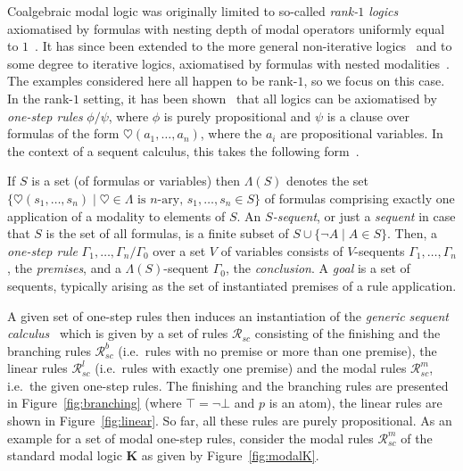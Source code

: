 \documentclass{entcs} \usepackage{entcsmacro}
\newcommand{\hearts}{\heartsuit}
\begin{document}
Coalgebraic modal logic was originally limited to so-called
\emph{rank-$1$ logics} axiomatised by formulas with nesting depth of
modal operators uniformly equal to $1$~\cite{Schroder05}. It has since
been extended to the more general non-iterative
logics~\cite{SchroderPattinson08d} and to some degree to iterative
logics, axiomatised by formulas with nested
modalities~\cite{SchroderPattinson08PHQ}. The examples considered here
all happen to be rank-$1$, so we focus on this case. In the rank-$1$
setting, it has been shown~\cite{Schroder05} that all logics can be
axiomatised by \emph{one-step rules} $\phi/\psi$, where $\phi$ is
purely propositional and $\psi$ is a clause over formulas of the form
$\hearts(a_1,\dots,a_n)$, where the $a_i$ are propositional
variables. In the context of a sequent calculus, this takes the
following form~\cite{PattinsonSchroder08b}.
\begin{definition}
  If $S$ is a set (of formulas or variables) then $\Lambda(S)$ denotes
  the set $\lbrace \hearts(s_1, \dots, s_n) \mid \hearts \in \Lambda
  \mbox{ is $n$-ary, } s_1, \dots, s_n \in S \rbrace$ of formulas
  comprising exactly one application of a modality to elements of
  $S$. An \emph{$S$-sequent}, or just a \emph{sequent} in case
  that $S$ is the set of all formulas, is a finite subset of
  $S \cup \lbrace \neg A \mid A
  \in S \rbrace$. Then, a \emph{one-step rule}
  $\Gamma_1,\dots,\Gamma_n/\Gamma_0$ over a set $V$ of variables
  consists of $V$-sequents $\Gamma_1,\dots,\Gamma_n$, the
  \emph{premises}, and a $\Lambda(S)$-sequent $\Gamma_0$, the
  \emph{conclusion}. A \emph{goal} is a set of sequents, typically
  arising as the set of instantiated premises of a rule application.
\end{definition}
\noindent A given set of one-step rules then induces an instantiation
of the \emph{generic sequent calculus}~\cite{PattinsonSchroder08b}
which is given by a set of rules $\mathcal{R}_{sc}$ consisting of the
finishing and the branching rules $\mathcal{R}^b_{sc}$ (i.e.\ rules
with no premise or more than one premise), the linear rules
$\mathcal{R}^l_{sc}$ (i.e.\ rules with exactly one premise) and the
modal rules $\mathcal R^m_{sc}$, i.e.\ the given one-step rules. The
finishing and the branching rules are presented in
Figure~\ref{fig:branching} (where $\top=\neg\bot$ and $p$ is an atom),
the linear rules are shown in Figure~\ref{fig:linear}. So far, all
these rules are purely propositional. As an example for a set of modal
one-step rules, consider the modal rules $\mathcal R^m_{sc}$ of the
standard modal logic \textbf{K} as given by Figure~\ref{fig:modalK}.
\end{document}
